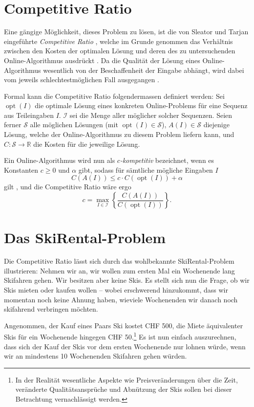 \documentclass[11pt]{scrreprt} %
\theoremstyle{definition}
\begin{document}
\section{Competitive Ratio}

Eine gängige Möglichkeit, dieses Problem zu lösen, ist die von Sleator und Tarjan eingeführte {\it Competitive Ratio} \cite{Sleator, BKK}, welche im Grunde genommen das Verhältnis zwischen den Kosten der optimalen Lösung und deren des zu untersuchenden Online-Algorithmus ausdrückt \cite{BKK}. Da die Qualität der Lösung eines Online-Algorithmus wesentlich von der Beschaffenheit der Eingabe abhängt, wird dabei vom jeweils schlechtestmöglichen Fall ausgegangen \cite{Trevisan}.

\bigskip
Formal kann die Competitive Ratio folgendermassen definiert werden: Sei $\operatorname{opt}(I)$ die optimale Lösung eines konkreten Online-Problems für eine Sequenz aus Teileingaben $I$. $\mathcal{I}$ sei die Menge aller möglicher solcher Sequenzen. Seien ferner $\mathcal{S}$ alle möglichen Lösungen (mit $\operatorname{opt}(I) \in \mathcal{S}$), $A(I) \in \mathcal{S}$ diejenige Lösung, welche der Online-Algorithmus zu diesem Problem liefern kann, und $C : \mathcal{S} \rightarrow \mathbb{R}$ die Kosten für die jeweilige Lösung.

\bigskip
Ein Online-Algorithmus wird nun als {\it $c$-kompetitiv} bezeichnet, wenn es Konstanten $c \ge 0$ und $\alpha$ gibt, sodass für sämtliche mögliche Eingaben $I$
\[
C(A(I)) \le c\cdot C(\operatorname{opt}(I)) + \alpha
\]
gilt \cite{BKK}, und die Competitive Ratio wäre ergo
\[
c = \max_{I \in \mathcal{I}} \left\{ \frac {C(A(I))}{C(\operatorname{opt}(I))} \right\}.
\]

\section{Das {\sc SkiRental}-Problem}

Die Competitive Ratio lässt sich durch das wohlbekannte {\sc SkiRental}-Problem illustrieren: Nehmen wir an, wir wollen zum ersten Mal ein Wochenende lang Skifahren gehen. Wir besitzen aber keine Skis. Es stellt sich nun die Frage, ob wir Skis mieten oder kaufen wollen -- wobei erschwerend hinzukommt, dass wir momentan noch keine Ahnung haben, wieviele Wochenenden wir danach noch skifahrend verbringen möchten.

Angenommen, der Kauf eines Paars Ski kostet CHF 500, die Miete äquivalenter Skis für ein Wochenende hingegen CHF 50.\footnote{In der Realität wesentliche Aspekte wie Preisveränderungen über die Zeit, veränderte Qualitätsansprüche und Abnützung der Skis sollen bei dieser Betrachtung vernachlässigt werden.} Es ist nun einfach auszurechnen, dass sich der Kauf der Skis vor dem ersten Wochenende nur lohnen würde, wenn wir an mindestens 10 Wochenenden Skifahren gehen würden.
\end{document}
